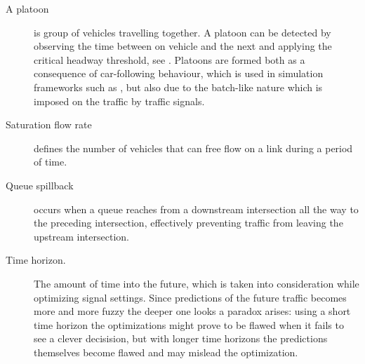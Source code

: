 \begin{description}
	\item[A platoon] is group of vehicles travelling together. A platoon can be detected by observing the time between on vehicle and the next and applying the critical headway threshold, see \cite[sct. 2]{25}. 
Platoons are formed both as a consequence of car-following behaviour, which is used in simulation frameworks such as \cite{treiber-2000-62}, but also due to the batch-like nature which is imposed on the traffic by traffic signals.

\item[Saturation flow rate] defines the number of vehicles that can free flow on a link during a period of time.

\item[Queue spillback] occurs when a queue reaches from a downstream intersection all the way to the preceding intersection, effectively preventing traffic from leaving the upstream intersection.

\item[Time horizon.] The amount of time into the future, which is taken into consideration while optimizing signal settings. Since predictions of the future traffic becomes more and more fuzzy the deeper one looks a paradox arises: using a short time horizon the optimizations might prove to be flawed when it fails to see a clever decisision, but with longer time horizons the predictions themselves become flawed and may mislead the optimization.

\end{description}

